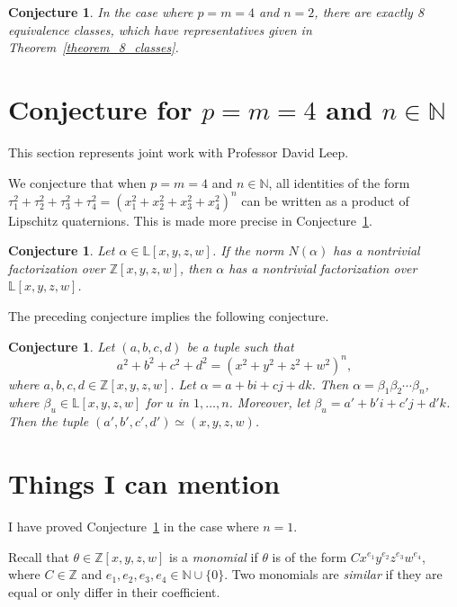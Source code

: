 \documentclass[12pt]{article}
\newtheorem{conjecture}[theorem]{Conjecture}
\theoremstyle{definition}
\theoremstyle{remark}
\newcommand{\Nnn}{\mathbb N}
\newcommand{\Zzz}{\mathbb Z}
\newcommand{\Lll}{\mathbb L}
\numberwithin{equation}{section}
\begin{document}
\begin{conjecture}
In the case where  \(p = m = 4\) and \(n = 2\),
there are exactly 8 equivalence classes, which have representatives
given in Theorem~\ref{theorem_8_classes}.
\end{conjecture}


\section{Conjecture for \(p = m = 4\) and \( n \in \Nnn \)}
This section represents joint work with Professor David Leep.

We conjecture that when \(p = m = 4\) and \( n \in \Nnn \),
all identities of the form
\(
\tau_1 ^ 2  + \tau_2 ^ 2  + \tau_3 ^ 2  + \tau_4 ^ 2  
= 
\left(  x_1 ^ 2 + x_2 ^ 2 + x_3 ^ 2 + x_4 ^ 2
\right) ^ n 
\)
can be written as
a product of Lipschitz quaternions.
This is made more precise in
Conjecture~\ref{conjecture_Ehrenborg-Leep}.

\begin{conjecture}
Let \( \alpha \in \Lll[x,y,z,w] \).
If the norm \( N(\alpha) \) has a nontrivial
factorization over \( \Zzz[x,y,z,w] \),
then \( \alpha \) has a nontrivial
factorization over \( \Lll[x,y,z,w] \).
\end{conjecture}
The preceding conjecture implies the following conjecture.
\begin{conjecture}
\label{conjecture_Ehrenborg-Leep}
Let \( (a, b, c, d) \) be a tuple such that
\[
a^2 + b^2 + c^2 + d^2 = (x^2 + y^2 + z^2 + w^2)^n,
\] 
where \( a, b, c, d \in \Zzz[x,y,z,w]\).
Let \(\alpha = a + bi + cj + dk \).
Then \( \alpha = \beta_1 \beta_2 \cdots \beta_n \),
where \( \beta_u \in \Lll[x,y,z,w] \) for \(u\) in \(1, \ldots, n\).
Moreover, let \( \beta_u = a' + b'i + c'j + d'k \). Then
the tuple \( (a', b', c', d') \simeq (x, y, z, w) \).
\end{conjecture}



\section{Things I can mention}
I have proved Conjecture~\ref{conjecture_Ehrenborg-Leep}
in the case where \(n = 1\).


Recall that \( \theta \in \Zzz[x,y,z,w] \) is a \emph{monomial} if \( \theta \)
is of the form \(Cx^{e_1}y^{e_2}z^{e_3}w^{e_4}\), where \( C \in \Zzz \)
and \( e_1,e_2,e_3,e_4 \in \Nnn \cup \{0\} \). 
Two monomials are \emph{similar} if they are equal or only differ in their
coefficient.
\end{document}
